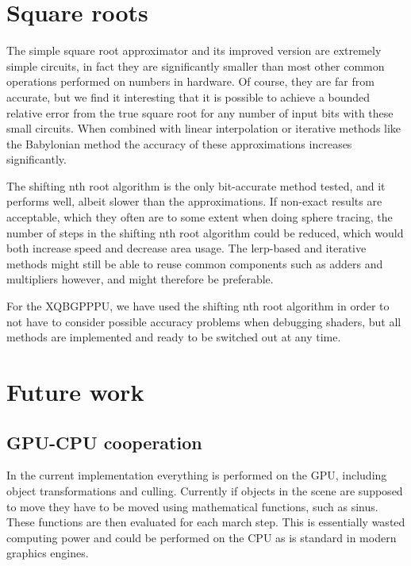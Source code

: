 	\section{Square roots}

		The simple square root approximator and its improved version are
		extremely simple circuits, in fact they are significantly smaller than
		most other common operations performed on numbers in hardware. Of
		course, they are far from accurate, but we find it interesting that it
		is possible to achieve a bounded relative error from the true square
		root for any number of input bits with these small circuits. When
		combined with linear interpolation or iterative methods like the
		Babylonian method the accuracy of these approximations increases
		significantly.
		
		The shifting nth root algorithm is the only bit-accurate method tested,
		and it performs well, albeit slower than the approximations. If
		non-exact results are acceptable, which they often are to some extent
		when doing sphere tracing, the number of steps in the shifting nth root
		algorithm could be reduced, which would both increase speed and
		decrease area usage. The lerp-based and iterative methods might still
		be able to reuse common components such as adders and multipliers
		however, and might therefore be preferable.
		
		For the XQBGPPPU, we have used the shifting nth root algorithm in order
		to not have to consider possible accuracy problems when debugging
		shaders, but all methods are implemented and ready to be switched out
		at any time.

	\section{Future work}

		\subsection{GPU-CPU cooperation}

			In the current implementation everything is performed on the GPU,
			including object transformations and culling. Currently if objects
			in the scene are supposed to move they have to be moved using
			mathematical functions, such as sinus. These functions are then
			evaluated for each march step. This is essentially wasted computing
			power and could be performed on the CPU as is standard in modern
			graphics engines.

